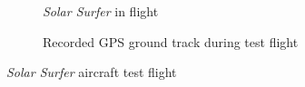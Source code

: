 \documentclass[12pt,vi,oneside,table]{report}
\begin{document}
    \begin{figure}[h]
        \centering
        \begin{subfigure}[b]{0.45\textwidth}
            \caption{\emph{Solar Surfer} in flight}
            \label{fig:solar_surfer_flight}
        \end{subfigure}
        \hfill
        \begin{subfigure}[b]{0.511\textwidth}
            \caption{Recorded GPS ground track during test flight}
            \label{fig:solar_surfer_track}
        \end{subfigure}
        \caption{\emph{Solar Surfer} aircraft test flight}
        \label{fig:solar_surfer_aircraft}
    \end{figure}
\end{document}
